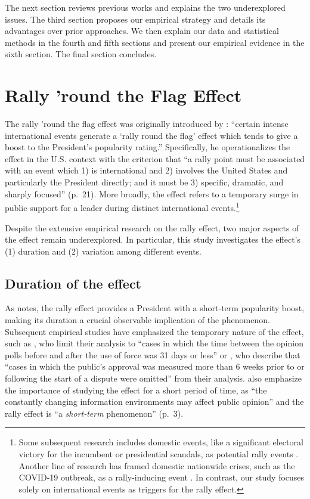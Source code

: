 \documentclass[letterpaper,12pt]{scrartcl}
\begin{document}
The next section reviews previous works and explains the two underexplored issues. The third section proposes our empirical strategy and details its advantages over prior approaches. We then explain our data and statistical methods in the fourth and fifth sections and present our empirical evidence in the sixth section. The final section concludes.

\section*{Rally 'round the Flag Effect\centering}

The rally 'round the flag effect was originally introduced by \citet[][p.~21]{Mueller1970APSR}: ``certain intense international events generate a `rally round the flag' effect which tends to give a boost to the President's popularity rating.'' Specifically, he operationalizes the effect in the U.S. context with the criterion that ``a rally point must be associated with an event which 1) is international and 2) involves the United States and particularly the President directly; and it must be 3) specific, dramatic, and sharply focused'' (p.~21).  More broadly, the effect refers to a temporary surge in public support for a leader during distinct international events.\footnote{Some subsequent research includes domestic events, like a significant electoral victory for the incumbent or presidential scandals, as potential rally events \citep[e.g.,][]{Newman2010ElectStud}. Another line of research has framed domestic nationwide crises, such as the COVID-19 outbreak, as a rally-inducing event \citep[e.g.,][]{Kritzinger2021WestEurPolit,Yam2020PNAS}. In contrast, our study focuses solely on international events as triggers for the rally effect.}

Despite the extensive empirical research on the rally effect, two major aspects of the effect remain underexplored. In particular, this study investigates the effect's (1) duration and (2) variation among different events.

\subsection*{Duration of the effect}

As \citet{Mueller1970APSR} notes, the rally effect provides a President with a short-term popularity boost, making its duration a crucial observable implication of the phenomenon. Subsequent empirical studies have emphasized the temporary nature of the effect, such as \citet[][p.~284]{Lian1993JCR}, who limit their analysis to ``cases in which the time between the opinion polls before and after the use of force was 31 days or less'' or \citet[][p.~670]{Baker2001JCR}, who describe that ``cases in which the public's approval was measured more than 6 weeks prior to or following the start of a dispute were omitted'' from their analysis. \citet{seo2023} also emphasize the importance of studying the effect for a short period of time, as ``the constantly changing information environments may affect public opinion'' and the rally effect is ``a \emph{short-term} phenomenon'' (p.~3).
\end{document}
